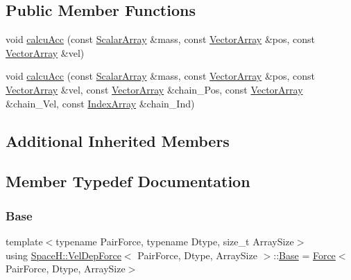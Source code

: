 \subsection*{Public Member Functions}
\begin{DoxyCompactItemize}
\item 
void \mbox{\hyperlink{struct_space_h_1_1_vel_dep_force_af317008a8a1371f2a36f9b44835343f2}{calcu\+Acc}} (const \mbox{\hyperlink{struct_space_h_1_1_vel_dep_force_ae4efbb88779fc063293b7853184378ac}{Scalar\+Array}} \&mass, const \mbox{\hyperlink{struct_space_h_1_1_vel_dep_force_ad2d0301ffff67a74018b92c17a3475de}{Vector\+Array}} \&pos, const \mbox{\hyperlink{struct_space_h_1_1_vel_dep_force_ad2d0301ffff67a74018b92c17a3475de}{Vector\+Array}} \&vel)
\item 
void \mbox{\hyperlink{struct_space_h_1_1_vel_dep_force_a0c90022c26911e9471e9d340e512124b}{calcu\+Acc}} (const \mbox{\hyperlink{struct_space_h_1_1_vel_dep_force_ae4efbb88779fc063293b7853184378ac}{Scalar\+Array}} \&mass, const \mbox{\hyperlink{struct_space_h_1_1_vel_dep_force_ad2d0301ffff67a74018b92c17a3475de}{Vector\+Array}} \&pos, const \mbox{\hyperlink{struct_space_h_1_1_vel_dep_force_ad2d0301ffff67a74018b92c17a3475de}{Vector\+Array}} \&vel, const \mbox{\hyperlink{struct_space_h_1_1_vel_dep_force_ad2d0301ffff67a74018b92c17a3475de}{Vector\+Array}} \&chain_\+Pos, const \mbox{\hyperlink{struct_space_h_1_1_vel_dep_force_ad2d0301ffff67a74018b92c17a3475de}{Vector\+Array}} \&chain_\+Vel, const \mbox{\hyperlink{struct_space_h_1_1_vel_dep_force_a81473a733ed71f51b81323c705283195}{Index\+Array}} \&chain_\+Ind)
\end{DoxyCompactItemize}
\subsection*{Additional Inherited Members}


\subsection{Member Typedef Documentation}
\mbox{\label{struct_space_h_1_1_vel_dep_force_a47a0c85f93ae37d3cce8f708df096c65}} 
\subsubsection{\texorpdfstring{Base}{Base}}
{\footnotesize\ttfamily template$<$typename Pair\+Force, typename Dtype, size\+\_\+t Array\+Size$>$ \\
using \mbox{\hyperlink{struct_space_h_1_1_vel_dep_force}{Space\+H\+::\+Vel\+Dep\+Force}}$<$ Pair\+Force, Dtype, Array\+Size $>$\+::\mbox{\hyperlink{struct_space_h_1_1_vel_dep_force_a47a0c85f93ae37d3cce8f708df096c65}{Base}} =  \mbox{\hyperlink{struct_space_h_1_1_force}{Force}}$<$Pair\+Force, Dtype, Array\+Size$>$}

